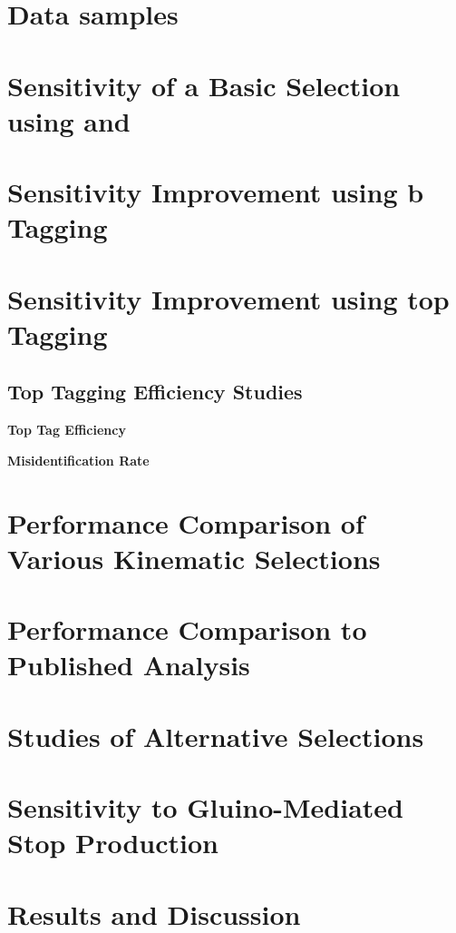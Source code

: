 \section{Data samples}
\label{sec:stop_samples}

\section{Sensitivity of a Basic Selection using \HT and \met}
\label{sec:stop_baseline}

\section{Sensitivity Improvement using b Tagging}
\label{sec:stop_btagging}

\section{Sensitivity Improvement using top Tagging}
\label{sec:stop_btagging}

\subsection{Top Tagging Efficiency Studies}
\label{subsec:stop_toptagging}

\begin{description}
 \item \textbf{Top Tag Efficiency}
 \item \textbf{Misidentification Rate}
\end{description}

\section{Performance Comparison of Various Kinematic Selections}
\label{sec:stop_cuts}

\section{Performance Comparison to Published Analysis}
\label{sec:stop_pub}

\section{Studies of Alternative Selections}
\label{sec:stop_alternatives}

\section{Sensitivity to Gluino-Mediated Stop Production}
\label{sec:stop_gluinos}

\section{Results and Discussion}
\label{sec:stop_results}


